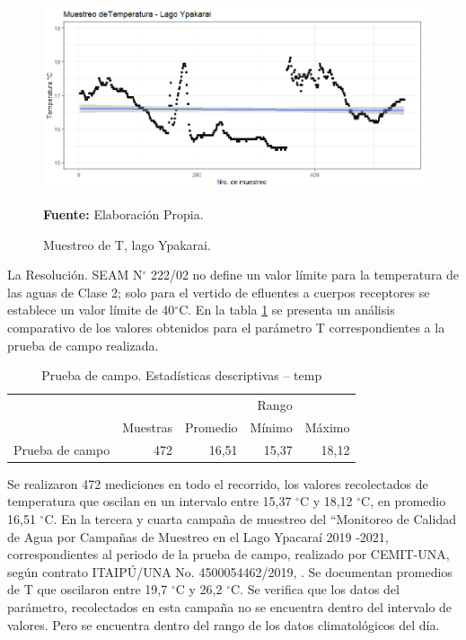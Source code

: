 \begin{figure}[H]
        \centering
        \includegraphics[width=0.75\linewidth]{Imagenes/cap4/Temp_lago.png}
        \caption {Muestreo de T, lago Ypakarai. }{\textbf{Fuente:}
        Elaboraci\'on Propia. }
        \label{fig:Lago_temp}
\end{figure}

La Resoluci\'on. SEAM N$ ^{\circ}$ 222/02 no define un valor límite para la temperatura de las aguas de Clase 2; solo para el vertido de efluentes a cuerpos receptores se establece un valor límite de 40$ ^{\circ}$C.
En la tabla \ref{table:Lago_temp} se presenta un an\'alisis comparativo de los valores obtenidos para el par\'ametro T correspondientes a la prueba de campo  realizada.

\begin{table}[H]
\centering
\caption{Prueba de campo. Estadísticas descriptivas – temp}
\label{table:Lago_temp}
\begin{tabular}{lrrrr}
\toprule
          & \multicolumn{3}{r}{Rango} \\ \cline{4-5}
          & Muestras & Promedio & Mínimo & Máximo \\
\midrule
Prueba de campo  &      472 &    16,51 & 15,37 & 18,12 \\
\bottomrule
\end{tabular}
\end{table}

Se realizaron 472 mediciones en todo el recorrido, los valores recolectados de temperatura que oscilan en  un intervalo entre 15,37 $ ^{\circ}$C y 18,12 $ ^{\circ}$C, en promedio 16,51 $^{\circ}$C.
En la tercera y cuarta campaña de muestreo del “Monitoreo de Calidad de Agua por Campañas de Muestreo en el Lago Ypacaraí 2019 -2021, correspondientes al periodo de la prueba de campo, realizado por CEMIT-UNA, seg\'un contrato ITAIPÚ/UNA No. 4500054462/2019, \cite{3er_Cemit}\cite{4to_Cemit}. Se documentan promedios de T que oscilaron entre 19,7 $ ^{\circ}$C y 26,2 $ ^{\circ}$C. 
Se verifica que los datos del par\'ametro, recolectados en esta campa\~na no se encuentra dentro del intervalo de valores. Pero se encuentra dentro del rango de los datos climatológicos del día. 

